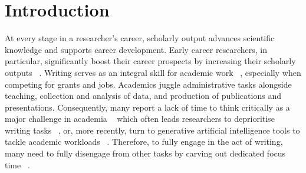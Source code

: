 \documentclass[10pt,letterpaper]{article}
\begin{document}



\linenumbers

\section*{Introduction}

At every stage in a researcher's career, scholarly output advances scientific knowledge and supports career development. Early career researchers, in particular, significantly boost their career prospects by increasing their scholarly outputs ~\cite{horta2016, wilkins2021}. Writing serves as an integral skill for academic work ~\cite{boice1984, hazelett2025}, especially when competing for grants and jobs. Academics juggle administrative tasks alongside teaching, collection and analysis of data, and production of publications and presentations. Consequently, many report a lack of time to think critically as a major challenge in academia ~\cite{menzies2007} which often leads researchers to deprioritise writing tasks ~\cite{boice1984, menzies2007}, or, more recently, turn to generative artificial intelligence tools to tackle academic workloads ~\cite{watermeyer2024generative}. Therefore, to fully engage in the act of writing, many need to fully disengage from other tasks by carving out dedicated focus time ~\cite{murray2009, murray2013}.
\end{document}
